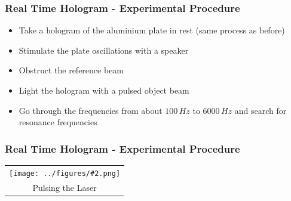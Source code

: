 \documentclass[10pt]{beamer}
\newcommand{\gra}[3][]{
	\begin{table}
	\centering
	\begin{tabular}[width=\textwidth]{c}
		\texttt{[image: ../figures/\#2.png]}\\
		\small #3
	\end{tabular}
	\end{table}
}
\begin{document}
\begin{frame}
	\frametitle{Real Time Hologram - Experimental Procedure}
	\begin{itemize}
		\item Take a hologram of the aluminium plate in rest (same process as before)
		\item Stimulate the plate oscillations with a speaker
		\item Obstruct the reference beam
		\item Light the hologram with a pulsed object beam
		\item Go through the frequencies from about $100\,\si{Hz}$ to $6000\,\si{Hz}$ and search for resonance frequencies
	\end{itemize}
\end{frame}

\begin{frame}
	\frametitle{Real Time Hologram - Experimental Procedure}
	\gra[0.85]{oszi-inv}{Pulsing the Laser}%
\end{frame}
\end{document}
